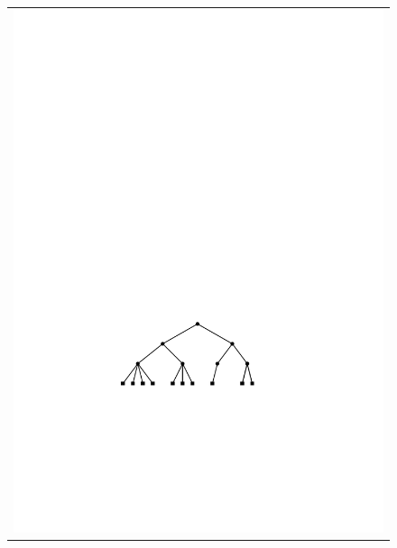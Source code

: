 \begin{figure}
\begin{center}
\begin{tabular}{c}
			\includegraphics[height=\FifthHeightScaleIfNeeded]{figs/24tree-remove-2} \\

\end{tabular}
\end{center}
\end{figure}
